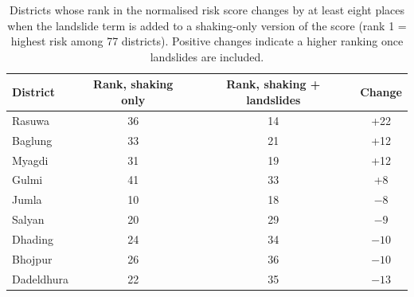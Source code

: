 \documentclass[11pt,a4paper]{article}
\begin{document}
\begin{table}[t]
\centering
\caption{Districts whose rank in the normalised risk score changes by at least eight places when the landslide term is added to a shaking-only version of the score (rank 1 = highest risk among 77 districts). Positive changes indicate a higher ranking once landslides are included.}
\label{tab:S2}
\begin{tabular}{lccc}
\toprule
District & Rank, shaking only & Rank, shaking + landslides & Change \\
\midrule
Rasuwa & 36 & 14 & +22 \\
Baglung & 33 & 21 & +12 \\
Myagdi & 31 & 19 & +12 \\
Gulmi & 41 & 33 & +8 \\
Jumla & 10 & 18 & $-8$ \\
Salyan & 20 & 29 & $-9$ \\
Dhading & 24 & 34 & $-10$ \\
Bhojpur & 26 & 36 & $-10$ \\
Dadeldhura & 22 & 35 & $-13$ \\
\bottomrule
\end{tabular}
\end{table}

\clearpage



\end{document}
